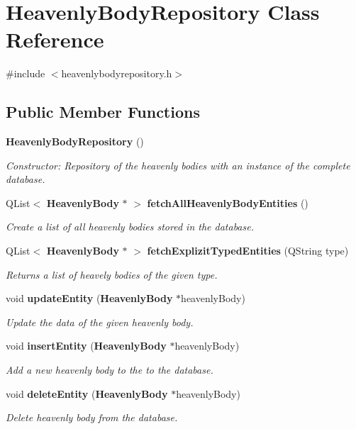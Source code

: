\section{\-Heavenly\-Body\-Repository \-Class \-Reference}
\label{d8/dde/classHeavenlyBodyRepository}


{\ttfamily \#include $<$heavenlybodyrepository.\-h$>$}

\subsection*{\-Public \-Member \-Functions}
\begin{DoxyCompactItemize}
\item 
{\bf \-Heavenly\-Body\-Repository} ()\label{d8/dde/classHeavenlyBodyRepository_ac3d5ecbaa6079313028df52accaca9d3}

\begin{DoxyCompactList}\small\item\em \-Constructor\-: \-Repository of the heavenly bodies with an instance of the complete database. \end{DoxyCompactList}\item 
\-Q\-List$<$ {\bf \-Heavenly\-Body} $\ast$ $>$ {\bf fetch\-All\-Heavenly\-Body\-Entities} ()
\begin{DoxyCompactList}\small\item\em \-Create a list of all heavenly bodies stored in the database. \end{DoxyCompactList}\item 
\-Q\-List$<$ {\bf \-Heavenly\-Body} $\ast$ $>$ {\bf fetch\-Explizit\-Typed\-Entities} (\-Q\-String type)
\begin{DoxyCompactList}\small\item\em \-Returns a list of heavely bodies of the given type. \end{DoxyCompactList}\item 
void {\bf update\-Entity} ({\bf \-Heavenly\-Body} $\ast$heavenly\-Body)
\begin{DoxyCompactList}\small\item\em \-Update the data of the given heavenly body. \end{DoxyCompactList}\item 
void {\bf insert\-Entity} ({\bf \-Heavenly\-Body} $\ast$heavenly\-Body)
\begin{DoxyCompactList}\small\item\em \-Add a new heavenly body to the to the database. \end{DoxyCompactList}\item 
void {\bf delete\-Entity} ({\bf \-Heavenly\-Body} $\ast$heavenly\-Body)
\begin{DoxyCompactList}\small\item\em \-Delete heavenly body from the database. \end{DoxyCompactList}\end{DoxyCompactItemize}


